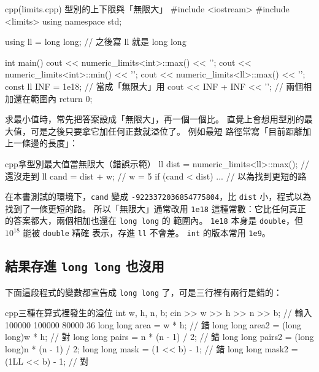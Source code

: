 \begin{example}[label=ex:limits]{cpp}{(limits.cpp) 型別的上下限與「無限大」}
#include <iostream>
#include <limits>
using namespace std;

using ll = long long;                   // 之後寫 ll 就是 long long

int main() {
    cout << numeric_limits<int>::max() << '\n';
    cout << numeric_limits<int>::min() << '\n';
    cout << numeric_limits<ll>::max() << '\n';
    const ll INF = 1e18;                // 當成「無限大」用
    cout << INF + INF << '\n';          // 兩個相加還在範圍內
    return 0;
}
\end{example}


求最小值時，常先把答案設成「無限大」，再一個一個比。 直覺上會想用型別的最大值，可是之後只要拿它加任何正數就溢位了。 例如最短
路徑常寫「目前距離加上一條邊的長度」：

\begin{code}{cpp}{拿型別最大值當無限大（錯誤示範）}
ll dist = numeric_limits<ll>::max();   // 還沒走到
ll cand = dist + w;                    // w = 5
if (cand < dist) { ... }               // 以為找到更短的路
\end{code}

在本書測試的環境下，\texttt{cand} 變成 \texttt{-9223372036854775804}，比
\texttt{dist} 小，程式以為找到了一條更短的路。 所以「無限大」通常改用
\texttt{1e18} 這種常數：它比任何真正的答案都大，兩個相加也還在 \texttt{long long} 的
範圍內。 \texttt{1e18} 本身是 \texttt{double}，但 $10^{18}$ 能被 \texttt{double} 精確
表示，存進 \texttt{ll} 不會差。 \texttt{int} 的版本常用 \texttt{1e9}。

\subsection{結果存進 \texttt{long long} 也沒用}

下面這段程式的變數都宣告成 \texttt{long long} 了，可是三行裡有兩行是錯的：

\begin{code}[label=code:overflow-demo]{cpp}{三種在算式裡發生的溢位}
int w, h, n, b;
cin >> w >> h >> n >> b;               // 輸入 100000 100000 80000 36
long long area = w * h;                // 錯
long long area2 = (long long)w * h;    // 對
long long pairs = n * (n - 1) / 2;     // 錯
long long pairs2 = (long long)n * (n - 1) / 2;
long long mask = (1 << b) - 1;         // 錯
long long mask2 = (1LL << b) - 1;      // 對
\end{code}

